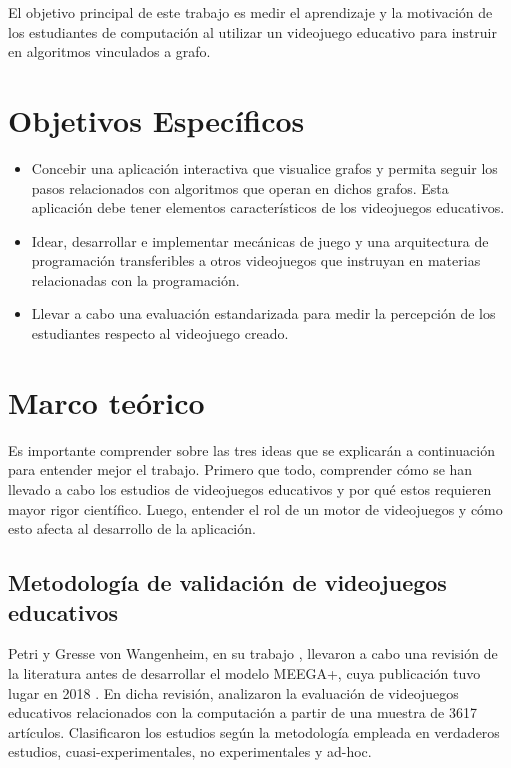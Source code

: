 El objetivo principal de este trabajo es medir el aprendizaje y la motivación de los estudiantes de computación al utilizar un videojuego educativo para instruir en algoritmos vinculados a grafo.

\section{Objetivos Específicos}

\begin{itemize}

\item Concebir una aplicación interactiva que visualice grafos y permita seguir los pasos relacionados con algoritmos que operan en dichos grafos. Esta aplicación debe tener elementos característicos de los videojuegos educativos.

\item Idear, desarrollar e implementar mecánicas de juego y una arquitectura de programación transferibles a otros videojuegos que instruyan en materias relacionadas con la programación.

\item Llevar a cabo una evaluación estandarizada para medir la percepción de los estudiantes respecto al videojuego creado.

\end{itemize}


\section{Marco teórico}

Es importante comprender sobre las tres ideas que se explicarán a continuación para entender mejor el trabajo. Primero que todo, comprender cómo se han llevado a cabo los estudios de videojuegos educativos y por qué estos requieren mayor rigor científico. Luego, entender el rol de un motor de videojuegos y cómo esto afecta al desarrollo de la aplicación.

\subsection{Metodología de validación de videojuegos educativos}

Petri y Gresse von Wangenheim, en su trabajo \cite{HowGamesComputingEducationEvaluated}, llevaron a cabo una revisión de la literatura antes de desarrollar el modelo MEEGA+, cuya publicación tuvo lugar en 2018 \cite{meegaplus}. En dicha revisión, analizaron la evaluación de videojuegos educativos relacionados con la computación a partir de una muestra de 3617 artículos. Clasificaron los estudios según la metodología empleada en verdaderos estudios, cuasi-experimentales, no experimentales y ad-hoc.

